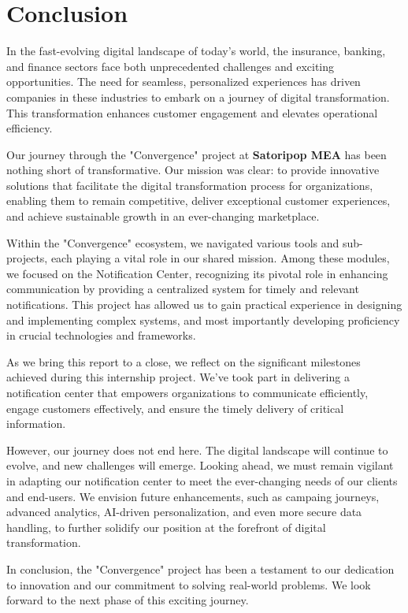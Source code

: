 \chapter*{Conclusion}
In the fast-evolving digital landscape of today's world, the insurance, banking, and finance sectors
face both unprecedented challenges and exciting opportunities. The need for seamless, personalized
experiences has driven companies in these industries to embark on a journey of digital transformation.
This transformation enhances customer engagement and elevates operational efficiency.

Our journey through the "Convergence" project at \textbf{Satoripop MEA} has been nothing short of transformative.
Our mission was clear: to provide innovative solutions that facilitate the digital transformation process
for organizations, enabling them to remain competitive, deliver exceptional customer experiences,
and achieve sustainable growth in an ever-changing marketplace.

Within the "Convergence" ecosystem, we navigated various tools and sub-projects, each playing a vital
role in our shared mission. Among these modules, we focused on the Notification Center, recognizing
its pivotal role in enhancing communication by providing a centralized system for timely and relevant
notifications. This project has allowed us to gain practical experience in designing and implementing
complex systems, and most importantly developing proficiency in crucial technologies and frameworks.

As we bring this report to a close, we reflect on the significant milestones achieved during this
internship project. We've took part in delivering a notification center that empowers organizations
to communicate efficiently, engage customers effectively, and ensure the timely delivery of critical
information.

However, our journey does not end here. The digital landscape will continue to evolve, and new
challenges will emerge. Looking ahead, we must remain vigilant in adapting our notification center
to meet the ever-changing needs of our clients and end-users. We envision future enhancements,
such as campaing journeys, advanced analytics, AI-driven personalization, and even more secure data handling,
to further solidify our position at the forefront of digital transformation.

In conclusion, the "Convergence" project has been a testament to our dedication to innovation and
our commitment to solving real-world problems. We look forward to the next phase of this exciting
journey.
